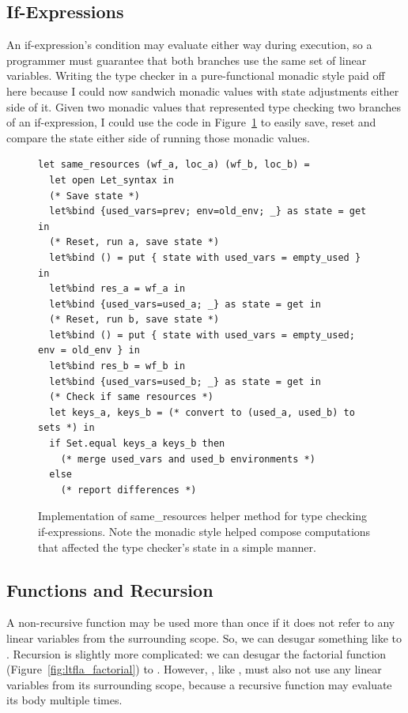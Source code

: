 \subsection{If-Expressions}

An if-expression's condition may evaluate either way during execution, so a
programmer must guarantee that both branches use the same set of linear
variables. Writing the type checker in a pure-functional monadic style paid off
here because I could now sandwich monadic values with state adjustments either
side of it. Given two monadic values that represented type checking two
branches of an if-expression, I could use the code in
Figure~\ref{fig:same_resources} to easily save, reset and compare the state
either side of running those monadic values.

\begin{figure}[tp]
    \begin{verbatim}
let same_resources (wf_a, loc_a) (wf_b, loc_b) =
  let open Let_syntax in
  (* Save state *)
  let%bind {used_vars=prev; env=old_env; _} as state = get in
  (* Reset, run a, save state *)
  let%bind () = put { state with used_vars = empty_used } in
  let%bind res_a = wf_a in
  let%bind {used_vars=used_a; _} as state = get in
  (* Reset, run b, save state *)
  let%bind () = put { state with used_vars = empty_used; env = old_env } in
  let%bind res_b = wf_b in
  let%bind {used_vars=used_b; _} as state = get in
  (* Check if same resources *)
  let keys_a, keys_b = (* convert to (used_a, used_b) to sets *) in
  if Set.equal keys_a keys_b then
    (* merge used_vars and used_b environments *)
  else
    (* report differences *)
    \end{verbatim}

    \caption{Implementation of same\_resources helper method for type checking
        if-expressions. Note the monadic style helped compose computations that
        affected the type checker's state in a simple manner.}\label{fig:same_resources}

\end{figure}

\subsection{Functions and Recursion}

A non-recursive function may be used more than once if it does not refer to any
linear variables from the surrounding scope. So, we can desugar something like
 to .  Recursion is slightly
more complicated: we can desugar the factorial function
(Figure~\ref{fig:ltfla_factorial}) to . However, , like , must also
not use any linear variables from its surrounding scope, because a
recursive function may evaluate its body multiple times.

